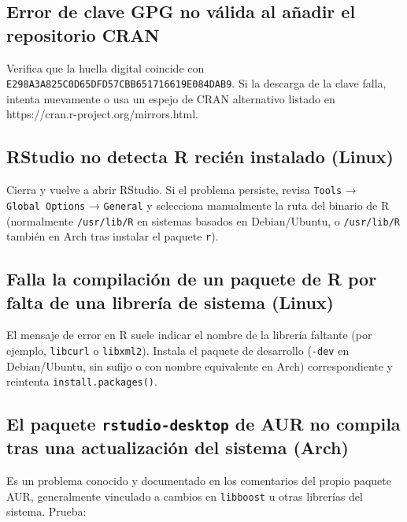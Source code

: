 \documentclass[
  man,
  floatsintext,
  longtable,
  a4paper,
  nolmodern,
  notxfonts,
  notimes,
  12pt,
  colorlinks=true,linkcolor=blue,citecolor=blue,urlcolor=blue]{apa7}
\begin{document}
\subsection{Error de clave GPG no válida al añadir el repositorio
CRAN}\label{error-de-clave-gpg-no-vuxe1lida-al-auxf1adir-el-repositorio-cran}

Verifica que la huella digital coincide con
\texttt{E298A3A825C0D65DFD57CBB651716619E084DAB9}. Si la descarga de la
clave falla, intenta nuevamente o usa un espejo de CRAN alternativo
listado en https://cran.r-project.org/mirrors.html.

\subsection{RStudio no detecta R recién instalado
(Linux)}\label{rstudio-no-detecta-r-reciuxe9n-instalado-linux}

Cierra y vuelve a abrir RStudio. Si el problema persiste, revisa
\texttt{Tools} → \texttt{Global\ Options} → \texttt{General} y
selecciona manualmente la ruta del binario de R (normalmente
\texttt{/usr/lib/R} en sistemas basados en Debian/Ubuntu, o
\texttt{/usr/lib/R} también en Arch tras instalar el paquete
\texttt{r}).

\subsection{Falla la compilación de un paquete de R por falta de una
librería de sistema
(Linux)}\label{falla-la-compilaciuxf3n-de-un-paquete-de-r-por-falta-de-una-libreruxeda-de-sistema-linux}

El mensaje de error en R suele indicar el nombre de la librería faltante
(por ejemplo, \texttt{libcurl} o \texttt{libxml2}). Instala el paquete
de desarrollo (\texttt{-dev} en Debian/Ubuntu, sin sufijo o con nombre
equivalente en Arch) correspondiente y reintenta
\texttt{install.packages()}.

\subsection{\texorpdfstring{El paquete \texttt{rstudio-desktop} de AUR
no compila tras una actualización del sistema
(Arch)}{El paquete rstudio-desktop de AUR no compila tras una actualización del sistema (Arch)}}\label{el-paquete-rstudio-desktop-de-aur-no-compila-tras-una-actualizaciuxf3n-del-sistema-arch}

Es un problema conocido y documentado en los comentarios del propio
paquete AUR, generalmente vinculado a cambios en \texttt{libboost} u
otras librerías del sistema. Prueba:
\end{document}
